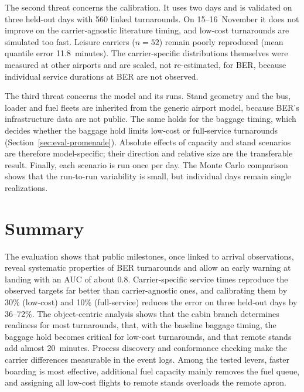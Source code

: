 The second threat concerns the calibration. It uses two days and is validated on three held-out days with 560 linked turnarounds. On 15--16~November it does not improve on the carrier-agnostic literature timing, and low-cost turnarounds are simulated too fast. Leisure carriers ($n=52$) remain poorly reproduced (mean quantile error 11.8~minutes). The carrier-specific distributions themselves were measured at other airports and are scaled, not re-estimated, for BER, because individual service durations at BER are not observed.

The third threat concerns the model and its runs. Stand geometry and the bus, loader and fuel fleets are inherited from the generic airport model, because BER's infrastructure data are not public. The same holds for the baggage timing, which decides whether the baggage hold limits low-cost or full-service turnarounds (Section~\ref{sec:eval-promenade}). Absolute effects of capacity and stand scenarios are therefore model-specific; their direction and relative size are the transferable result. Finally, each scenario is run once per day. The Monte Carlo comparison shows that the run-to-run variability is small, but individual days remain single realizations.

\section{Summary}

The evaluation shows that public milestones, once linked to arrival observations, reveal systematic properties of BER turnarounds and allow an early warning at landing with an AUC of about 0.8. Carrier-specific service times reproduce the observed targets far better than carrier-agnostic ones, and calibrating them by 30\% (low-cost) and 10\% (full-service) reduces the error on three held-out days by 36--72\%. The object-centric analysis shows that the cabin branch determines readiness for most turnarounds, that, with the baseline baggage timing, the baggage hold becomes critical for low-cost turnarounds, and that remote stands add almost 20~minutes. Process discovery and conformance checking make the carrier differences measurable in the event logs. Among the tested levers, faster boarding is most effective, additional fuel capacity mainly removes the fuel queue, and assigning all low-cost flights to remote stands overloads the remote apron.
